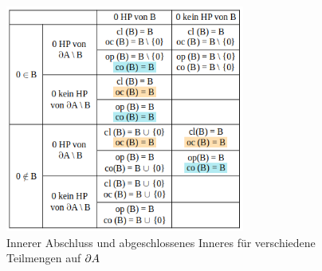     \begin{figure}[ht]
        \centering
        \includegraphics[width=0.7\textwidth]{gfx/tab-standardbsp.png}
        \caption{Innerer Abschluss und abgeschlossenes Inneres für verschiedene Teilmengen auf $\partial A$}
        \label{fig:tab-standardbsp}
    \end{figure}
    
    
